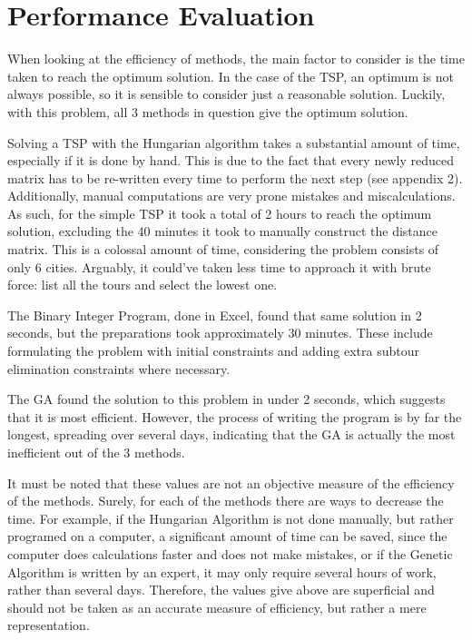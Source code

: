 \section{Performance Evaluation}	
	
When looking at the efficiency of methods, the main factor to consider is the time taken to reach the optimum solution. In the case of the TSP, an optimum is not always possible, so it is sensible to consider just a reasonable solution. Luckily, with this problem, all 3 methods in question give the optimum solution.

\vspace{5mm}

Solving a TSP with the Hungarian algorithm takes a substantial amount of time, especially if it is done by hand. This is due to the fact that every newly reduced matrix has to be re-written every time to perform the next step (see appendix 2). Additionally, manual computations are very prone mistakes and miscalculations. As such, for the simple TSP it took a total of 2 hours to reach the optimum solution, excluding the 40 minutes it took to manually construct the distance matrix. This is a colossal amount of time, considering the problem consists of only 6 cities. Arguably, it could’ve taken less time to approach it with brute force: list all the tours and select the lowest one.

\vspace{5mm}

The Binary Integer Program, done in Excel, found that same solution in 2 seconds, but the preparations took approximately 30 minutes. These include formulating the problem with initial constraints and adding extra subtour elimination constraints where necessary.

\vspace{5mm}

The GA found the solution to this problem in under 2 seconds, which suggests that it is most efficient. However, the process of writing the program is by far the longest, spreading over several days, indicating that the GA is actually the most inefficient out of the 3 methods.

\vspace{5mm}

It must be noted that these values are not an objective measure of the efficiency of the methods. Surely, for each of the methods there are ways to decrease the time. For example, if the Hungarian Algorithm is not done manually, but rather programed on a computer, a significant amount of time can be saved, since the computer does calculations faster and does not make mistakes, or if the Genetic Algorithm is written by an expert, it may only require several hours of work, rather than several days. Therefore, the values give above are superficial and should not be taken as an accurate measure of efficiency, but rather a mere representation.

